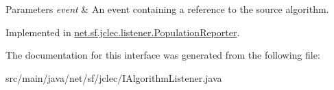 \begin{DoxyParams}{Parameters}
{\em event} & An event containing a reference to the source algorithm. \\
\hline
\end{DoxyParams}


Implemented in \hyperlink{classnet_1_1sf_1_1jclec_1_1listener_1_1_population_reporter_aed679fe96d46074859a369ac899ef85c}{net.\-sf.\-jclec.\-listener.\-Population\-Reporter}.



The documentation for this interface was generated from the following file\-:\begin{DoxyCompactItemize}
\item 
src/main/java/net/sf/jclec/I\-Algorithm\-Listener.\-java\end{DoxyCompactItemize}
